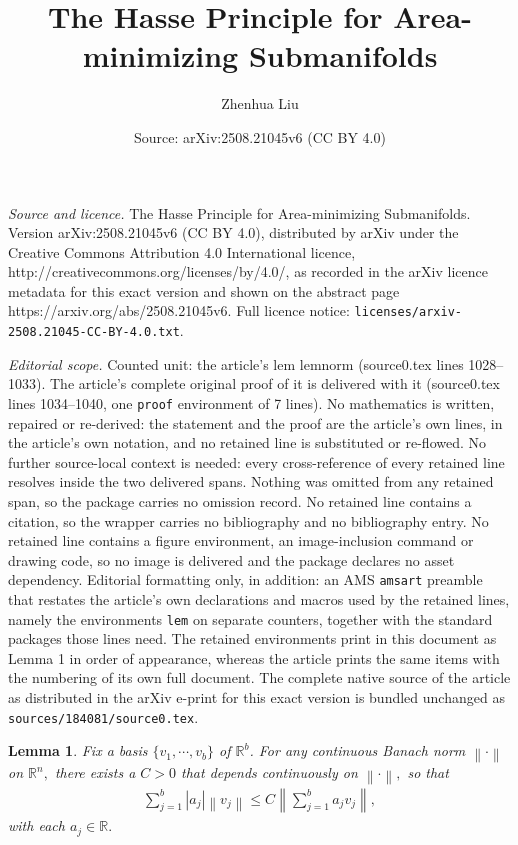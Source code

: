 \documentclass[10pt,a4paper]{amsart}
\title{The Hasse Principle for Area-minimizing Submanifolds}
\author{Zhenhua Liu}
\date{Source: arXiv:2508.21045v6 (CC BY 4.0)}
\newtheorem{lem}{Lemma}
\newcommand{\R}{\mathbb{R}}
\newcommand{\cd}{\cdots}
\newcommand{\no}[1]{\left\lVert#1\right\rVert}
\begin{document}
\maketitle

\noindent\emph{Source and licence.} The Hasse Principle for Area-minimizing Submanifolds. Version arXiv:2508.21045v6 (CC BY 4.0), distributed by arXiv under the Creative Commons Attribution 4.0 International licence, http://creativecommons.org/licenses/by/4.0/, as recorded in the arXiv licence metadata for this exact version and shown on the abstract page https://arxiv.org/abs/2508.21045v6. Full licence notice: \texttt{licenses/arxiv-2508.21045-CC-BY-4.0.txt}.\par\smallskip

\noindent\textit{Editorial scope.} Counted unit: the article's lem lemnorm (source0.tex lines 1028--1033). The article's complete original proof of it is delivered with it (source0.tex lines 1034--1040, one \texttt{proof} environment of 7 lines). No mathematics is written, repaired or re-derived: the statement and the proof are the article's own lines, in the article's own notation, and no retained line is substituted or re-flowed.  No further source-local context is needed: every cross-reference of every retained line resolves inside the two delivered spans.  Nothing was omitted from any retained span, so the package carries no omission record.  No retained line contains a citation, so the wrapper carries no bibliography and no bibliography entry.  No retained line contains a figure environment, an image-inclusion command or drawing code, so no image is delivered and the package declares no asset dependency.  Editorial formatting only, in addition: an AMS \texttt{amsart} preamble that restates the article's own declarations and macros used by the retained lines, namely the environments \texttt{lem} on separate counters, together with the standard packages those lines need.  The retained environments print in this document as Lemma 1 in order of appearance, whereas the article prints the same items with the numbering of its own full document.  The complete native source of the article as distributed in the arXiv e-print for this exact version is bundled unchanged as \texttt{sources/184081/source0.tex}.
	\begin{lem}\label{lemnorm}
	Fix a basis $\{v_1,\cd,v_b\}$ of $\R^b$. For any continuous Banach norm $\no{\cdot}$ on $\R^n,$ there exists a $C>0$ that depends continuously on $\no{\cdot},$ so that 
	\begin{align*}
		\sum_{j=1}^b|a_j|\no{v_j}\le C \no{\sum_{j=1}^b a_jv_j},
	\end{align*}with each $a_j\in \R.$
	\end{lem}
\end{document}
